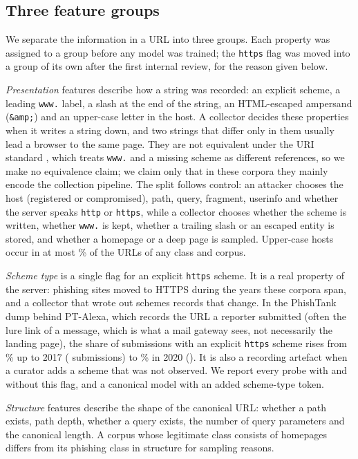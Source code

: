 

\subsection{Three feature groups}
We separate the information in a URL into three groups. Each property was assigned to a group before any model was trained; the \texttt{https} flag was moved into a group of its own after the first internal review, for the reason given below.

\emph{Presentation} features describe how a string was recorded: an explicit scheme, a leading \texttt{www.} label, a slash at the end of the string, an HTML-escaped ampersand (\texttt{\&amp;}) and an upper-case letter in the host. A collector decides these properties when it writes a string down, and two strings that differ only in them usually lead a browser to the same page. They are not equivalent under the URI standard \citep{rfc3986}, which treats \texttt{www.} and a missing scheme as different references, so we make no equivalence claim; we claim only that in these corpora they mainly encode the collection pipeline. The split follows control: an attacker chooses the host (registered or compromised), path, query, fragment, userinfo and whether the server speaks \texttt{http} or \texttt{https}, while a collector chooses whether the scheme is written, whether \texttt{www.} is kept, whether a trailing slash or an escaped entity is stored, and whether a homepage or a deep page is sampled. Upper-case hosts occur in at most \UpperMaxPct\% of the URLs of any class and corpus.

\emph{Scheme type} is a single flag for an explicit \texttt{https} scheme. It is a real property of the server: phishing sites moved to HTTPS during the years these corpora span, and a collector that wrote out schemes records that change. In the PhishTank dump behind PT-Alexa, which records the URL a reporter submitted (often the lure link of a message, which is what a mail gateway sees, not necessarily the landing page), the share of submissions with an explicit \texttt{https} scheme rises from \PTHttpsEarly\% up to 2017 (\PTHttpsEarlyN{} submissions) to \PTHttpsTwenty\% in 2020 (\PTNTwenty). It is also a recording artefact when a curator adds a scheme that was not observed. We report every probe with and without this flag, and a canonical model with an added scheme-type token.

\emph{Structure} features describe the shape of the canonical URL: whether a path exists, path depth, whether a query exists, the number of query parameters and the canonical length. A corpus whose legitimate class consists of homepages differs from its phishing class in structure for sampling reasons.


